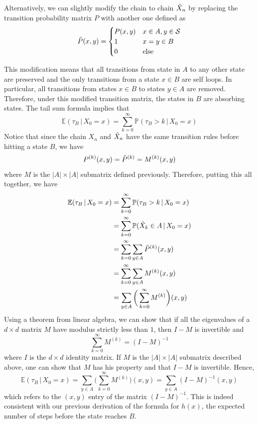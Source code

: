\documentclass{article}
\begin{document}
      Alternatively, we can slightly modify the chain to chain $\Tilde{X}_n$ by replacing the transition probability matrix $P$ with another one defined as 
      \begin{equation}
        \Tilde{P}(x, y) = \begin{cases}
        P(x, y) & x \in A, y \in \mathcal{S} \\
        1 & x = y \in B \\
        0 & \text{else}
        \end{cases}
      \end{equation}

      This modification means that all transitions from state in $A$ to any other state are preserved and the only transitions from a state $x \in B$ are self loops. In particular, all transitions from states $x \in B$ to states $y \in A$ are removed. Therefore, under this modified transition matrix, the states in $B$ are absorbing states. The tail sum formula implies that
      \begin{equation}
        \mathbb{E}(\tau_B \,|\, X_0 = x) = \sum_{k=0}^\infty \mathbb{P}(\tau_B > k \,|\, X_0 = x)
      \end{equation}
      Notice that since the chain $X_n$ and $\Tilde{X}_n$ have the same transition rules before hitting a state $B$, we have 
      \begin{equation}
        P^{(k)} (x, y) = \Tilde{P}^{(k)} = M^{(k)}(x, y)
      \end{equation}
      where $M$ is the $|A| \times |A|$ submatrix defined previously. Therefore, putting this all together, we have
      \begin{align*}
        \mathbb{E}(\tau_B \,|\, X_0 = x) & = \sum_{k=0}^\infty \mathbb{P}(\tau_B > k \,|\, X_0 = x) \\
        & = \sum_{k=0}^\infty \mathbb{P}(\Tilde{X}_k \in A \,|\, X_0 = x) \\
        & = \sum_{k=0}^\infty \sum_{y \in A} \Tilde{P}^{(k)} (x, y) \\
        & = \sum_{k=0}^\infty \sum_{y \in A} M^{(k)} (x, y) \\
        & = \sum_{y \in A} \bigg( \sum_{k=0}^\infty M^{(k)} \bigg) (x, y) 
      \end{align*}
      Using a theorem from linear algebra, we can show that if all the eigenvalues of a $d \times d$ matrix $M$ have modulus strictly less than $1$, then $I-M$ is invertible and
      \begin{equation}
        \sum_{k=0}^\infty M^{(k)} = (I - M)^{-1}
      \end{equation}
      where $I$ is the $d \times d$ identity matrix. If $M$ is the $|A| \times |A|$ submatrix described above, one can show that $M$ has his property and that $I - M$ is invertible. Hence, 
      \begin{equation}
        \mathbb{E}(\tau_B \,|\, X_0 = x) = \sum_{y \in A} \bigg( \sum_{k=0}^\infty M^{(k)} \bigg) (x, y) = \sum_{y \in A} (I-M)^{-1} (x, y)
      \end{equation}
      which refers to the $(x, y)$ entry of the matrix $(I - M)^{-1}$. This is indeed consistent with our previous derivation of the formula for $h(x)$, the expected number of steps before the state reaches $B$. 
\end{document}
